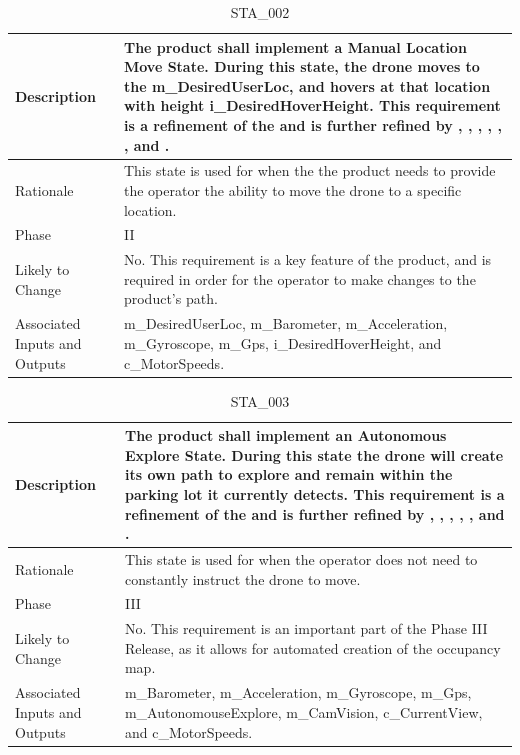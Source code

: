 \documentclass{article}
\begin{document}
\begin{table}[!h]
\begin{center}
\caption {STA\_002} 
\label{STA_002}
\begin{tabular}{ | m{3cm} | m{11cm} | }
\hline
Description & The product shall implement a Manual Location Move State. During this state, the drone moves to the m\_DesiredUserLoc, and hovers at that location with height i\_DesiredHoverHeight. This requirement is a refinement of the \nameref{Manual Location Move State} and is further refined by \nameref{PERF_003}, \nameref{PERF_004}, \nameref{PERF_006}, \nameref{PERF_007}, \nameref{SAFE_001}, \nameref{SAFE_003}, and \nameref{USE_003}. \\
\hline
Rationale & This state is used for when the the product needs to provide the operator the ability to move the drone to a specific location. \\
\hline
Phase & II \\
\hline
Likely to Change & No. This requirement is a key feature of the product, and is required in order for the operator to make changes to the product's path. \\
\hline
Associated Inputs and Outputs & m\_DesiredUserLoc, m\_Barometer, m\_Acceleration, m\_Gyroscope, m\_Gps, i\_DesiredHoverHeight, and c\_MotorSpeeds. \\
\hline
\end{tabular}
\end{center}
\end{table}

\begin{table}[!h]
\begin{center}
\caption {STA\_003} 
\label{STA_003}
\begin{tabular}{ | m{3cm} | m{11cm} | }
\hline
Description & The product shall implement an Autonomous Explore State. During this state the drone will create its own path to explore and remain within the parking lot it currently detects. This requirement is a refinement of the \nameref{Autonomous Explore State} and is further refined by \nameref{PERF_001}, \nameref{PERF_004}, \nameref{PERF_007}, \nameref{SAFE_001}, \nameref{SAFE_003}, and \nameref{USE_003}. \\
\hline
Rationale & This state is used for when the operator does not need to constantly instruct the drone to move. \\
\hline
Phase & III \\
\hline
Likely to Change & No. This requirement is an important part of the Phase III Release, as it allows for automated creation of the occupancy map. \\
\hline
Associated Inputs and Outputs & m\_Barometer, m\_Acceleration, m\_Gyroscope, m\_Gps, m\_AutonomouseExplore, m\_CamVision, c\_CurrentView, and c\_MotorSpeeds. \\
\hline
\end{tabular}
\end{center}
\end{table}
\end{document}
